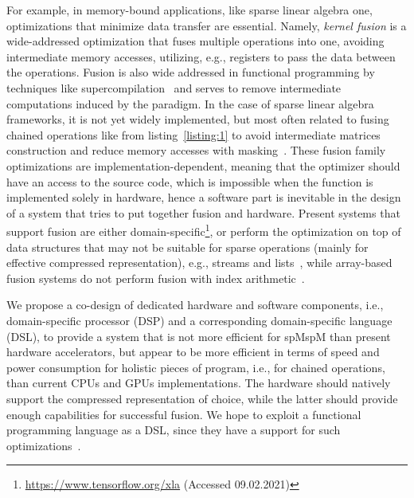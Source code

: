 \documentclass[sigplan,review,anonymous,nonacm]{acmart}\settopmatter{printfolios=true,printccs=false,printacmref=false}
\begin{document}
For example, in memory-bound applications, like sparse linear algebra one, optimizations that minimize data transfer are essential. 
Namely, \emph{kernel fusion} is a wide-addressed optimization that fuses multiple operations into one, avoiding intermediate memory accesses, utilizing, e.g., registers to pass the data between the operations.
Fusion is also wide addressed in functional programming by techniques like supercompilation~\cite{supercompilation} and serves to remove intermediate computations induced by the paradigm.
In the case of sparse linear algebra frameworks, it is not yet widely implemented, but most often related to fusing chained operations like
from listing~\ref{listing:1} to avoid intermediate matrices construction and reduce memory accesses with masking~\cite{yang2020graphblast}.
These fusion family optimizations are implementation-dependent, meaning that the optimizer should have an access to the source code, which is impossible when the function is implemented solely in hardware, hence a software part is inevitable in the design of a system that tries to put together fusion and hardware.
Present systems that support fusion are either domain-specific\footnote{\url{https://www.tensorflow.org/xla} (Accessed 09.02.2021)}, or perform the optimization on top of data structures that may not be suitable for sparse operations (mainly for effective compressed representation), e.g., streams and lists~\cite{StreamFusion,StreamFusion2}, while array-based fusion systems do not perform fusion with index arithmetic~\cite{Futhark}.

We propose a co-design of dedicated hardware and software components, i.e., domain-specific processor (DSP) and a corresponding domain-specific language (DSL), to provide a system that is not more efficient for spMspM than present hardware accelerators, but appear to be more efficient in terms of speed and power consumption for holistic pieces of program, i.e., for chained operations, than current CPUs and GPUs implementations.
The hardware should natively support the compressed representation of choice, while the latter should provide enough capabilities for successful fusion. We hope to exploit a functional programming language as a DSL, since they have a support for such optimizations~\cite{hosc}.
\end{document}
